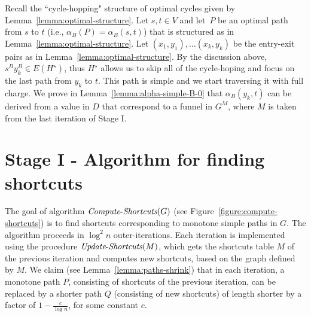 \documentclass[11pt]{article}
\newcommand{\ComputeS}{\mbox{{\it Compute}-{\it Shortcuts}}}
\newcommand{\UpdateS}{\mbox{{\it Update}-{\it Shortcuts}}}
\begin{document}
Recall the ``cycle-hopping" structure of optimal cycles given by Lemma~\ref{lemma:optimal-structure}. Let $s,t\in V$ and let~$P$ be an optimal path from $s$ to $t$ (i.e., $\alpha_B(P)=\alpha_B(s,t)$) that is structured as in Lemma~\ref{lemma:optimal-structure}. Let $(x_1,y_1),\ldots (x_k,y_k)$  be the entry-exit pairs as in Lemma~\ref{lemma:optimal-structure}. By the  discussion above, $s^B y_k^B \in E(H^\star)$, thus $H^\star$ allows us to skip all of the cycle-hoping and focus on the last path from $y_k$ to $t$. This path is simple and we start traversing it with  full charge. We prove in Lemma~\ref{lemma:alpha-simple-B-0} that $\alpha_B(y_k,t)$ can be derived from a value in $D$ that correspond to a funnel in $G^M$, where $M$ is taken from the last iteration of Stage I.

\section{Stage I - Algorithm for finding 
shortcuts}\label{S-shortucts}
The goal of algorithm $\ComputeS(G)$  (see Figure~\ref{figure:compute-shortcuts}) is to find shortcuts corresponding to monotone simple paths in $G$. The algorithm proceeds in $\log^2 n$ outer-iterations. Each iteration is implemented using the procedure $\UpdateS(M)$, which gets the shortcuts table $M$ of the previous iteration and computes new shortcuts, based on the graph defined by $M$. We claim (see Lemma~\ref{lemma:paths-shrink}) that in each iteration, a monotone path $P$, consisting of shortcuts of the previous iteration, can be replaced by a shorter path $Q$ (consisting of new shortcuts) of length shorter by a factor of $1-\frac{c}{\log n}$, for some constant $c$.
\end{document}
